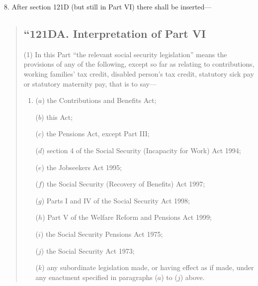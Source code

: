 \documentclass[12pt,a4paper]{article}
\begin{document}
8. After section 121D (but still in Part VI) there shall be inserted—
\begin{quotation}
\subsection*{“121DA. Interpretation of Part VI}

(1) In this Part “the relevant social security legislation” means the provisions of any of the following, except so far as relating to contributions, working families' tax credit, disabled person’s tax credit, statutory sick pay or statutory maternity pay, that is to say—
\begin{enumerate}\item[]
($a$) the Contributions and Benefits Act;

($b$) this Act;

($c$) the Pensions Act, except Part III;

($d$) section 4 of the Social Security (Incapacity for Work) Act 1994;

($e$) the Jobseekers Act 1995;

($f$) the Social Security (Recovery of Benefits) Act 1997;

($g$) Parts I and IV of the Social Security Act 1998;

($h$) Part V of the Welfare Reform and Pensions Act 1999;

($i$) the Social Security Pensions Act 1975;

($j$) the Social Security Act 1973;

($k$) any subordinate legislation made, or having effect as if made, under any enactment specified in paragraphs ($a$)  to ($j$)  above.
\end{enumerate}


\end{quotation}
\end{document}
